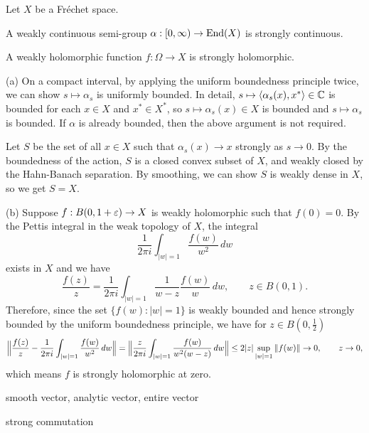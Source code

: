 \documentclass{../../../small}
\begin{document}
\begin{prop}
Let $X$ be a Fr\'echet space.
\begin{parts}
\item A weakly continuous semi-group $\alpha:[0,\infty)\to\operatorname{End}(X)$ is strongly continuous.
\item A weakly holomorphic function $f:\Omega\to X$ is strongly holomorphic.
\end{parts}
\end{prop}
\begin{pf}
(a)
On a compact interval, by applying the uniform boundedness principle twice, we can show $s\mapsto\alpha_s$ is uniformly bounded.
In detail, $s\mapsto\langle\alpha_s(x),x^*\rangle\in\mathbb{C}$ is bounded for each $x\in X$ and $x^*\in X^*$, so $s\mapsto\alpha_s(x)\in X$ is bounded and $s\mapsto\alpha_s$ is bounded.
If $\alpha$ is already bounded, then the above argument is not required.

Let $S$ be the set of all $x\in X$ such that $\alpha_s(x)\to x$ strongly as $s\to0$.
By the boundedness of the action, $S$ is a closed convex subset of $X$, and weakly closed by the Hahn-Banach separation.
By smoothing, we can show $S$ is weakly dense in $X$, so we get $S=X$.

(b)
Suppose $f:B(0,1+\varepsilon)\to X$ is weakly holomorphic such that $f(0)=0$.
By the Pettis integral in the weak topology of $X$, the integral
\[\frac1{2\pi i}\int_{|w|=1}\frac{f(w)}{w^2}\,dw\]
exists in $X$ and we have
\[\frac{f(z)}z=\frac1{2\pi i}\int_{|w|=1}\frac1{w-z}\frac{f(w)}w\,dw,\qquad z\in B(0,1).\]
Therefore, since the set $\{f(w):|w|=1\}$ is weakly bounded and hence strongly bounded by the uniform boundedness principle, we have for $z\in B(0,\frac12)$
\[\Bigl\|\frac{f(z)}z-\frac1{2\pi i}\int_{|w|=1}\frac{f(w)}{w^2}\,dw\Bigr\|=\Bigl\|\frac z{2\pi i}\int_{|w|=1}\frac{f(w)}{w^2(w-z)}\,dw\Bigr\|\le2|z|\sup_{|w|=1}\|f(w)\|\to0,\qquad z\to0,\]
which means $f$ is strongly holomorphic at zero.

\end{pf}

\begin{prop}
smooth vector, analytic vector, entire vector
\end{prop}

\begin{prop}
strong commutation
\end{prop}
\end{document}
